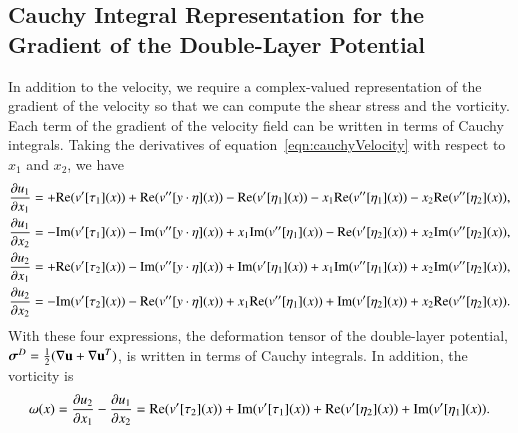 \documentclass[preprint, 10pt]{elsarticle}
\begin{document}
\subsection{Cauchy Integral Representation for the Gradient of the
Double-Layer Potential}
In addition to the velocity, we require a complex-valued representation
of the gradient of the velocity so that we can compute the shear stress
and the vorticity.  Each term of the gradient of the velocity field can
be written in terms of Cauchy integrals.  Taking the derivatives of
equation~\eqref{eqn:cauchyVelocity} with respect to $x_1$ and $x_2$, we
have 
\begin{equation}
\label{eqn:cauchyGradient}
  \begin{aligned}
    \frac{\partial u_1}{\partial x_1} &= +{\operatorname{Re}} (v'[\tau_1](x)) + 
      {\operatorname{Re}} (v''[y\cdot\eta](x)) - {\operatorname{Re}} (v'[\eta_1](x)) - 
      x_1{\operatorname{Re}} (v''[\eta_1](x)) - x_2{\operatorname{Re}} (v''[\eta_2](x)), \\
    \frac{\partial u_1}{\partial x_2} &= - {\operatorname{Im}} (v'[\tau_1](x)) - 
      {\operatorname{Im}} (v''[y\cdot\eta](x)) + x_1{\operatorname{Im}} (v''[\eta_1](x)) - 
      {\operatorname{Re}} (v'[\eta_2](x)) + x_2{\operatorname{Im}} (v''[\eta_2](x)), \\
    \frac{\partial u_2}{\partial x_1} &= +{\operatorname{Re}} (v'[\tau_2](x)) - 
      {\operatorname{Im}} (v''[y\cdot\eta](x)) + {\operatorname{Im}} (v'[\eta_1](x)) +
      x_1{\operatorname{Im}} (v''[\eta_1](x)) + x_2{\operatorname{Im}} (v''[\eta_2](x)), \\
    \frac{\partial u_2}{\partial x_2} &= -{\operatorname{Im}} (v'[\tau_2](x)) - 
      {\operatorname{Re}} (v''[y\cdot\eta](x)) + x_1{\operatorname{Re}} (v''[\eta_1](x)) +
      {\operatorname{Im}} (v'[\eta_2](x)) + x_2{\operatorname{Re}} (v''[\eta_2](x)).
  \end{aligned}
\end{equation}
With these four expressions, the deformation tensor of the double-layer
potential, ${\boldsymbol\sigma}^D = \frac{1}{2} (\nabla {\mathbf{u}} + \nabla {\mathbf{u}}^T)$, is
written in terms of Cauchy integrals.  In addition, the vorticity is
\begin{align}
  \omega(x) = \frac{\partial u_2}{\partial x_1} - \frac{\partial u_1}{\partial x_2} = 
{\operatorname{Re}} (v'[\tau_2](x)) + {\operatorname{Im}} (v'[\tau_1](x)) 
 + {\operatorname{Re}} (v'[\eta_2](x))+ {\operatorname{Im}} (v'[\eta_1](x)).
\end{align}




\end{document}

